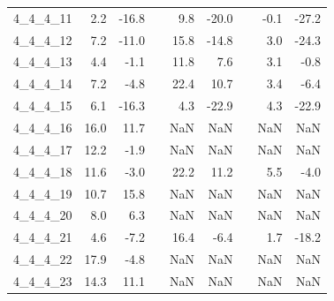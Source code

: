 \begin{longtable}{lrrcrrcrr}
4\_4\_4\_11      &                 2.2 &                 -16.8 &&                  9.8 &                  -20.0 &&                 -0.1 &                  -27.2 \\
4\_4\_4\_12      &                 7.2 &                 -11.0 &&                 15.8 &                  -14.8 &&                  3.0 &                  -24.3 \\
4\_4\_4\_13      &                 4.4 &                  -1.1 &&                 11.8 &                    7.6 &&                  3.1 &                   -0.8 \\
4\_4\_4\_14      &                 7.2 &                  -4.8 &&                 22.4 &                   10.7 &&                  3.4 &                   -6.4 \\
4\_4\_4\_15      &                 6.1 &                 -16.3 &&                  4.3 &                  -22.9 &&                  4.3 &                  -22.9 \\
4\_4\_4\_16      &                16.0 &                  11.7 &&                  NaN &                    NaN &&                  NaN &                    NaN \\
4\_4\_4\_17      &                12.2 &                  -1.9 &&                  NaN &                    NaN &&                  NaN &                    NaN \\
4\_4\_4\_18      &                11.6 &                  -3.0 &&                 22.2 &                   11.2 &&                  5.5 &                   -4.0 \\
4\_4\_4\_19      &                10.7 &                  15.8 &&                  NaN &                    NaN &&                  NaN &                    NaN \\
4\_4\_4\_20      &                 8.0 &                   6.3 &&                  NaN &                    NaN &&                  NaN &                    NaN \\
4\_4\_4\_21      &                 4.6 &                  -7.2 &&                 16.4 &                   -6.4 &&                  1.7 &                  -18.2 \\
4\_4\_4\_22      &                17.9 &                  -4.8 &&                  NaN &                    NaN &&                  NaN &                    NaN \\
4\_4\_4\_23      &                14.3 &                  11.1 &&                  NaN &                    NaN &&                  NaN &                    NaN \\

\end{longtable}
